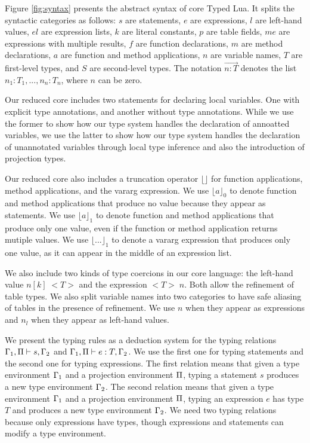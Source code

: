 Figure \ref{fig:syntax} presents the abstract syntax of core Typed Lua.
It splits the syntactic categories as follows:
$s$ are statements, $e$ are expressions, $l$ are left-hand values,
$el$ are expression lists, $k$ are literal constants, $p$ are table fields,
$me$ are expressions with multiple results, $f$ are function declarations,
$m$ are method declarations, $a$ are function and method applications,
$n$ are variable names, $T$ are first-level types, and $S$ are second-level types.
The notation $\vec{n{:}T}$ denotes the list $n_{1}{:}T_{1}, ..., n_{n}{:}T_{n}$,
where $n$ can be zero.

Our reduced core includes two statements for declaring local variables.
One with explicit type annotations, and another without type annotations.
While we use the former to show how our type system handles the declaration
of annoatted variables, we use the latter to show how our type system
handles the declaration of unannotated variables through local type inference
and also the introduction of projection types.

Our reduced core also includes a truncation operator $\lfloor \rfloor$ for
function applications, method applications, and the vararg expression.
We use $\lfloor a \rfloor_{0}$ to denote function and method applications
that produce no value because they appear as statements.
We use $\lfloor a \rfloor_{1}$ to denote function and method applications
that produce only one value, even if the function or method application
returns mutiple values.
We use $\lfloor {...} \rfloor_{1}$ to denote a vararg expression that
produces only one value, as it can appear in the middle of an
expression list.

We also include two kinds of type coercions in our core language:
the left-hand value $n[k] \; {<}T{>}$ and the expression ${<}T{>} \;n$.
Both allow the refinement of table types.
We also split variable names into two categories to have safe aliasing
of tables in the presence of refinement.
We use $n$ when they appear as expressions and $n_{l}$ when they
appear as left-hand values.

We present the typing rules as a deduction system for the typing relations
$\Gamma_{1}, \Pi \vdash s, \Gamma_{2}$ and $\Gamma_{1}, \Pi \vdash e : T, \Gamma_{2}$.
We use the first one for typing statements and the second one for typing expressions.
The first relation means that given a type environment $\Gamma_{1}$
and a projection environment $\Pi$, typing a statement $s$ produces
a new type environment $\Gamma_{2}$.
The second relation means that given a type environment $\Gamma_{1}$
and a projection environment $\Pi$, typing an expression $e$ has
type $T$ and produces a new type environment $\Gamma_{2}$.
We need two typing relations because only expressions have types,
though expressions and statements can modify a type environment.

